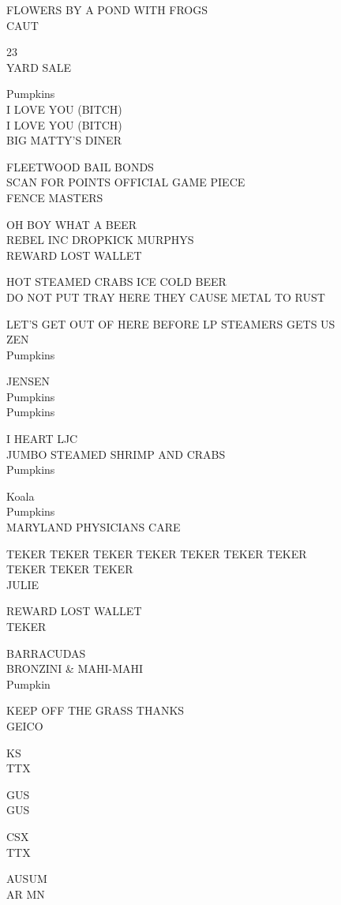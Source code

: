 \documentclass[10pt,letterpaper]{article}
\begin{document}
FLOWERS BY A POND WITH FROGS\\
CAUT

23\\
YARD SALE

Pumpkins\\
I LOVE YOU (BITCH)\\
I LOVE YOU (BITCH)\\
BIG MATTY'S DINER

FLEETWOOD BAIL BONDS\\
SCAN FOR POINTS OFFICIAL GAME PIECE\\
FENCE MASTERS

OH BOY WHAT A BEER\\
REBEL INC DROPKICK MURPHYS\\
REWARD LOST WALLET

HOT STEAMED CRABS ICE COLD BEER\\
DO NOT PUT TRAY HERE THEY CAUSE METAL TO RUST

LET'S GET OUT OF HERE BEFORE LP STEAMERS GETS US\\
ZEN\\
Pumpkins

JENSEN\\
Pumpkins\\
Pumpkins

I HEART LJC\\
JUMBO STEAMED SHRIMP AND CRABS\\
Pumpkins

Koala\\
Pumpkins\\
MARYLAND PHYSICIANS CARE

TEKER TEKER TEKER TEKER TEKER TEKER TEKER\\
TEKER TEKER TEKER\\
JULIE

REWARD LOST WALLET\\
TEKER

BARRACUDAS\\
BRONZINI \& MAHI{-}MAHI\\
Pumpkin

KEEP OFF THE GRASS THANKS\\
GEICO

KS\\
TTX

GUS\\
GUS

CSX\\
TTX

AUSUM\\
AR MN
\end{document}
